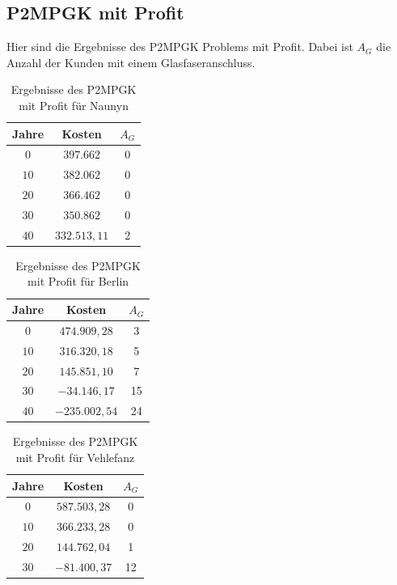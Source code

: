 \documentclass[11pt,a4paper]{article}
\theoremstyle{my_th_style1}
\begin{document}
\vspace{5cm}

\subsection*{P2MPGK mit Profit}
Hier sind die Ergebnisse des P2MPGK Problems mit Profit. Dabei ist $A_G$ die Anzahl der Kunden mit einem Glasfaseranschluss.

\begin{table}[!htbp]
	\centering
	\begin{tabular}{c|c|c}
		\centering
		Jahre & Kosten & $A_G$ \\	
		\hline
		$0$   	 & \(397.662\) & 0  \\
		$10$ 	&  \(382.062\) & 0  \\
		$20$   	&  \(366.462\)  & 0  \\
		$30$    &  \(350.862\) & 0  \\
		$40$    &  \(332.513,11\)  & 2 \\
	\end{tabular}
	\caption{Ergebnisse des P2MPGK mit Profit f\"ur Naunyn} 
	\label{P2MPGKProfitN}
\end{table}

\begin{table}[!htbp]
	\centering
	\begin{tabular}{c|c|c}
		\centering
		Jahre & Kosten & $A_G$ \\	
		\hline
		$0$   	 &  \(474.909,28\) & 3  \\
		$10$ 	&  \(316.320,18\) & 5  \\
		$20$   	&   \(145.851,10\) & 7  \\
		$30$    &   $ -34.146,17$	& 15  \\
		$40$    & $-235.002,54$ &  24 \\
	\end{tabular}
	\caption{Ergebnisse des P2MPGK mit Profit f\"ur Berlin}
	\label{P2MPGKProfitB}
\end{table}

\begin{table}[!htbp]
	\centering
	\begin{tabular}{c|c|c}
		\centering
		Jahre & Kosten & $A_G$ \\	
		\hline
		$0$   	 & $587.503,28$ &0  \\
		$10$ 	& $366.233,28$ & 0  \\
		$20$   	&  $144.762,04$  & 1  \\
		$30$    &  $-81.400,37$ & 12 \\
	\end{tabular}
	\caption{Ergebnisse des P2MPGK mit Profit f\"ur Vehlefanz} 
	\label{P2MPGKProfitV}
\end{table}

\end{document}
